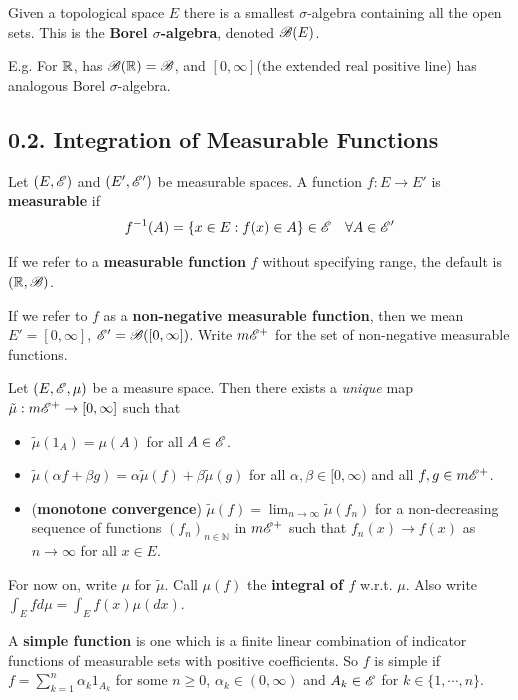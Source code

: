 \documentclass[12pt,a4paper]{report}
\begin{document}
Given a topological space $E$ there is a smallest $\sigma$-algebra containing all the open sets. This is the \textbf{Borel $\sigma$-algebra}, denoted $\mathscr{B}(E)$.
\s

E.g. For $\mathbb{R}$, has $\mathscr{B}(\mathbb{R}) = \mathscr{B}$, and $[0,\infty]$(the extended real positive line) has analogous Borel $\sigma$-algebra.
\s

\subsection*{0.2. Integration of Measurable Functions}

Let $(E, \mathscr{E})$ and $(E', \mathscr{E}')$ be measurable spaces. A function $f: E \rightarrow E'$ is \textbf{measurable} if
\begin{align*}
f^{-1}(A) = \{ x\in E : f(x) \in A \} \in \mathscr{E} \quad \forall A \in \mathscr{E}'
\end{align*}

If we refer to a \textbf{measurable function} $f$ without specifying range, the default is $(\mathbb{R}, \mathscr{B})$. 
\s

If we refer to $f$ as a \textbf{non-negative measurable function}, then we mean $E' = [0, \infty]$, $\mathscr{E}' = \mathscr{B}([0,\infty])$. Write $m\mathscr{E}^+$ for the set of non-negative measurable functions.
\s

 Let $(E,\mathscr{E}, \mu)$ be a measure space. Then there exists a \textit{unique} map $\tilde{\mu} : m \mathscr{E}^+ \rightarrow [0,\infty]$ such that
\begin{itemize}
\item[(a)] $\tilde{\mu}(1_A) = \mu(A)$ for all $A \in \mathscr{E}$.
\item[(b)] $\tilde{\mu}(\alpha f + \beta g)= \alpha \tilde{\mu}(f) + \beta \tilde{\mu}(g)$ for all $\alpha, \beta \in [0,\infty)$ and all $f,g \in m \mathscr{E}^+$.
\item[(c)] (\textbf{monotone convergence}) $\tilde{\mu}(f) = \lim_{n\rightarrow \infty} \tilde{\mu}(f_n)$ for a non-decreasing sequence of functions $(f_n)_{n\in \mathbb{N}}$ in $m\mathscr{E}^+$ such that $f_n(x) \rightarrow f(x)$ as $n\rightarrow \infty$ for all $x\in E$. 
\end{itemize}
\eos
\s

For now on, write $\mu$ for $\tilde{\mu}$. Call $\mu(f)$ the \textbf{integral of $f$} w.r.t. $\mu$. Also write $\int_E fd\mu = \int_E f(x) \mu(dx)$.
\s

A \textbf{simple function } is one which is a finite linear combination of indicator functions of measurable sets with positive coefficients. So $f$ is simple if $f = \sum_{k=1}^n \alpha_k 1_{A_k}$ for some $n \geq 0$, $\alpha_k \in (0,\infty)$ and $A_k \in \mathscr{E}$ for $k\in \{1,\cdots, n\}$.
\s
\end{document}

